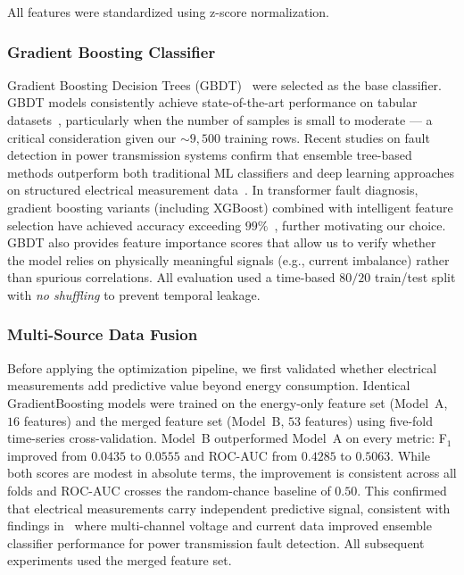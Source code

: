 \documentclass[11pt]{article}
\begin{document}
All features were standardized using z-score normalization.

\subsubsection*{Gradient Boosting Classifier}
Gradient Boosting Decision Trees (GBDT)~\cite{friedman2001gbm} were selected as the base classifier. GBDT models consistently achieve state-of-the-art performance on tabular datasets~\cite{shwartz2022tabular}, particularly when the number of samples is small to moderate --- a critical consideration given our $\sim 9{,}500$ training rows. Recent studies on fault detection in power transmission systems confirm that ensemble tree-based methods outperform both traditional ML classifiers and deep learning approaches on structured electrical measurement data~\cite{nature2025robust}. In transformer fault diagnosis, gradient boosting variants (including XGBoost) combined with intelligent feature selection have achieved accuracy exceeding $99\%$~\cite{frontiers2021igaxgboost}, further motivating our choice. GBDT also provides feature importance scores that allow us to verify whether the model relies on physically meaningful signals (e.g., current imbalance) rather than spurious correlations. All evaluation used a time-based $80/20$ train/test split with \emph{no shuffling} to prevent temporal leakage.

\subsubsection*{Multi-Source Data Fusion}
Before applying the optimization pipeline, we first validated whether electrical measurements add predictive value beyond energy consumption. Identical GradientBoosting models were trained on the energy-only feature set (Model~A, $16$ features) and the merged feature set (Model~B, $53$ features) using five-fold time-series cross-validation. Model~B outperformed Model~A on every metric: F$_1$ improved from $0.0435$ to $0.0555$ and ROC-AUC from $0.4285$ to $0.5063$. While both scores are modest in absolute terms, the improvement is consistent across all folds and ROC-AUC crosses the random-chance baseline of $0.50$. This confirmed that electrical measurements carry independent predictive signal, consistent with findings in~\cite{nature2025robust} where multi-channel voltage and current data improved ensemble classifier performance for power transmission fault detection. All subsequent experiments used the merged feature set.
\end{document}
